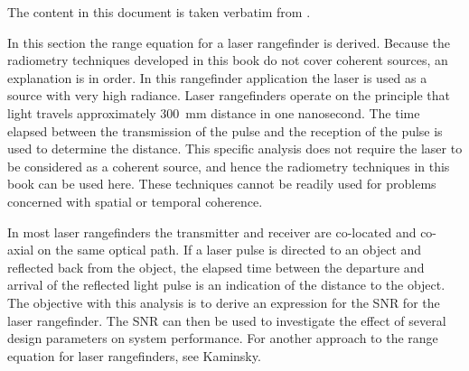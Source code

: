 
The content in this document is taken verbatim from \cite{Willers2013}.


\noindent
In this section the range equation for a laser rangefinder is derived. Because the radiometry techniques developed in this book do not cover coherent sources, an explanation is in order. In this rangefinder application  the laser is used as a source with very high radiance. Laser rangefinders operate on the principle that light travels approximately 300~mm distance in one nanosecond. The time elapsed between the transmission of the pulse and the reception of the pulse is used to determine the distance. This specific analysis does not require the laser to be considered as a coherent source, and hence the radiometry techniques in this book can be used here. These techniques cannot be readily used for problems concerned with spatial or temporal coherence.

In most laser rangefinders the transmitter and receiver are co-located and co-axial on the same optical path. If a laser pulse
is directed to an object and reflected back from the object, the elapsed time between the departure and arrival of the reflected light pulse is an indication of the distance to the object. The objective with this analysis is to derive an expression for the SNR for the laser rangefinder. The  SNR can then be used to investigate the effect of several design parameters on system performance. For another approach to the range equation for laser rangefinders, see Kaminsky.\cite{Kaminski1980}



